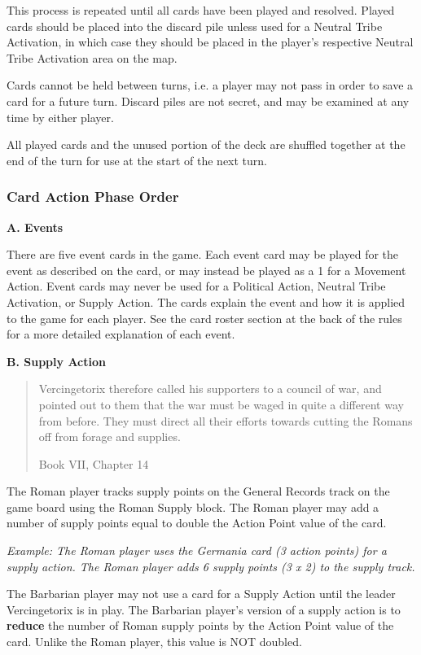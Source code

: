 This process is repeated until all cards have been played and resolved. Played cards should be placed into the discard pile unless used for a Neutral Tribe Activation, in which case they should be placed in the player's respective Neutral Tribe Activation area on the map.

Cards cannot be held between turns, i.e. a player may not pass in order to save a card for a future turn. Discard piles are not secret, and may be examined at any time by either player.

All played cards and the unused portion of the deck are shuffled together at the end of the turn for use at the start of the next turn.

\subsubsection{Card Action Phase Order}

\textbf{A. Events}
\par
There are five event cards in the game. Each event card may be played for the event as described on the card, or may instead be played as a 1 for a Movement Action. Event cards may never be used for a Political Action, Neutral Tribe Activation, or Supply Action. The cards explain the event and how it is applied to the game for each player. See the card roster section at the back of the rules for a more detailed explanation of each event.

\textbf{B. Supply Action}
\blockquote[Book VII, Chapter 14]{Vercingetorix therefore called his supporters to a council of war, and pointed out to them that the war must be waged in quite a different way from before. They must direct all their efforts towards cutting the Romans off from forage and supplies.}
\par
The Roman player tracks supply points on the General Records track on the game board using the Roman Supply block. The Roman player may add a number of supply points equal to double the Action Point value of the card.

\textit{Example: The Roman player uses the Germania card (3 action points) for a supply action. The Roman player adds 6 supply points (3 x 2) to the supply track.}

The Barbarian player may not use a card for a Supply Action until the leader Vercingetorix is in play. The Barbarian player's version of a supply action is to \textbf{reduce} the number of Roman supply points by the Action Point value of the card. Unlike the Roman player, this value is NOT doubled.

